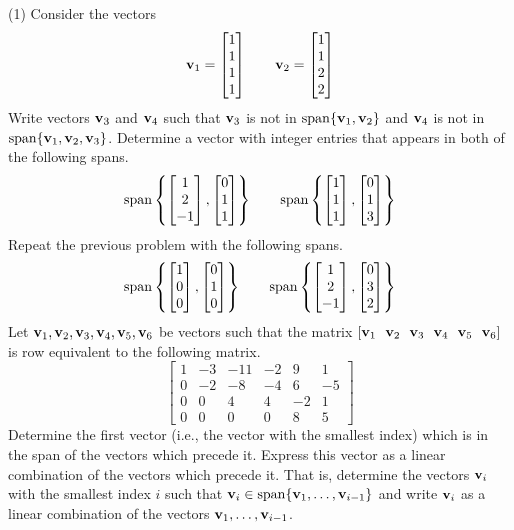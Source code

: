 \begin{tasks}[resume, style=enumerate](1)
\task
  Consider the vectors
  \begin{displaymath}
    \mathbf v_1 = \begin{bmatrix} 1 \\ 1 \\ 1 \\ 1 \end{bmatrix}
    \qquad
    \mathbf v_2 = \begin{bmatrix} 1 \\ 1 \\ 2 \\ 2 \end{bmatrix}
  \end{displaymath}
  Write vectors $\mathbf v_3$ and $\mathbf v_4$ such that $\mathbf v_3$ is not in
  $\operatorname{\mathrm{span}}\{\mathbf v_1, \mathbf v_2\}$ and $\mathbf v_4$ is not in $\operatorname{\mathrm{span}}\{\mathbf v_1,
  \mathbf v_2, \mathbf v_3\}$.
\task
  Determine a vector with integer entries that appears in both of the
  following spans.
  \begin{displaymath}
    \operatorname{\mathrm{span}}\left\{
     \begin{bmatrix} 1 \\ 2 \\ -1 \end{bmatrix} ,
     \begin{bmatrix} 0 \\ 1 \\ 1 \end{bmatrix} 
    \right\}
    \qquad
    \operatorname{\mathrm{span}}\left\{
     \begin{bmatrix} 1 \\ 1 \\ 1 \end{bmatrix} ,
     \begin{bmatrix} 0 \\ 1 \\ 3 \end{bmatrix} 
    \right\}
  \end{displaymath}
\task
  Repeat the previous problem with the following spans.
  \begin{displaymath}
    \operatorname{\mathrm{span}}\left\{
     \begin{bmatrix} 1 \\ 0 \\ 0 \end{bmatrix} ,
     \begin{bmatrix} 0 \\ 1 \\ 0 \end{bmatrix} 
    \right\}
    \qquad
    \operatorname{\mathrm{span}}\left\{
     \begin{bmatrix} 1 \\ 2 \\ -1 \end{bmatrix} ,
     \begin{bmatrix} 0 \\ 3 \\ 2 \end{bmatrix} 
    \right\}
  \end{displaymath}
\task
  Let $\mathbf v_1, \mathbf v_2, \mathbf v_3, \mathbf v_4, \mathbf v_5, \mathbf v_6$ be vectors such that
  the matrix $[\vv_1 \ \ \vv_2 \ \ \vv_3 \ \ \vv_4 \ \ \vv_5 \ \ \vv_6]$
  is row equivalent to the following matrix.
  \begin{displaymath}
    \begin{bmatrix}
      1 & -3 & -11 & -2 & 9 & 1 \\
      0 & -2 & -8 & -4 & 6 & -5 \\
      0 & 0 & 4 & 4 & -2 & 1 \\
      0 & 0 & 0 & 0 & 8 & 5
    \end{bmatrix}
  \end{displaymath}
  Determine the first vector (i.e., the vector with the smallest
  index) which is in the span of the vectors which precede it.
  Express this vector as a linear combination of the vectors which
  precede it.  That is, determine the vectors $\mathbf v_i$ with the
  smallest index $i$ such that $\mathbf v_i \in \operatorname{\mathrm{span}} \{ \mathbf v_1, \dots,
  \mathbf v_{i - 1}\}$ and write $\mathbf v_i$ as a linear combination of the
  vectors $\mathbf v_1, \dots, \mathbf v_{i - 1}$.
\end{tasks}

